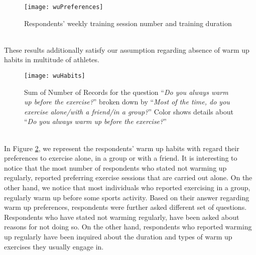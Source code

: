 \begin{figure}[h]
    \centering
    \texttt{[image: wuPreferences]}
    \caption{Respondents' weekly training session number and training duration}
    \label{fig:wuPreferences}
\end{figure}\\
These results additionally satisfy our assumption regarding absence of warm up habits in multitude of athletes. \\
\begin{figure}[h]
    \centering
    \texttt{[image: wuHabits]}
    \caption[Results for `\textit{Do you always warm up before the exercise?}'' ]{Sum of Number of Records for the question ``\textit{Do you always warm up before the exercise?}'' broken down by ``\textit{Most of the time, do you exercise alone/with a friend/in a group?}'' Color shows details about ``\textit{Do you always warm up before the exercise?}''}
    \label{fig:wuHabits}
\end{figure}\\
In Figure \ref{fig:wuHabits}, we represent the respondents' warm up habits with regard their preferences to exercise alone, in a group or with a friend. It is interesting to notice that the most number of respondents who stated not warming up regularly, reported preferring exercise sessions that are carried out alone. On the other hand, we notice that most individuals who reported exercising in a group, regularly warm up before some sports activity. Based on their answer regarding warm up preferences, respondents were further asked different set of questions. Respondents who have stated not warming regularly, have been asked about reasons for not doing so. On the other hand, respondents who reported warming up regularly have been inquired about the duration and types of warm up exercises they usually engage in.

